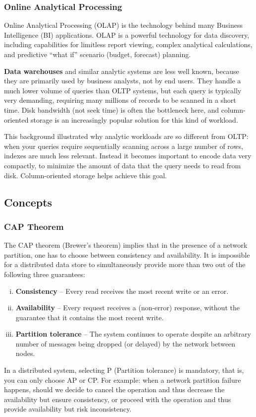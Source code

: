 \documentclass{article}
\begin{document}
    \subsubsection{Online Analytical Processing}
    Online Analytical Processing (OLAP) is the technology behind many Business Intelligence (BI) applications. OLAP is a powerful technology for data discovery, including capabilities for limitless report viewing, complex analytical calculations, and predictive “what if” scenario (budget, forecast) planning.

    \textbf{Data warehouses} and similar analytic systems are less well known, because they are primarily used by business analysts, not by end users. They handle a much lower volume of queries than OLTP systems, but each query is typically very demanding, requiring many millions of records to be scanned in a short time. Disk bandwidth (not seek time) is often the bottleneck here, and column-oriented storage is an increasingly popular solution for this kind of workload.
    
    This background illustrated why analytic workloads are so different from OLTP: when your queries require sequentially scanning across a large number of rows, indexes are much less relevant. Instead it becomes important to encode data very compactly, to minimize the amount of data that the query needs to read from disk. Column-oriented storage helps achieve this goal.
    
    \subsection{Concepts}
    \subsubsection{CAP Theorem}
    The CAP theorem (Brewer's theorem) implies that in the presence of a network partition, one has to choose between consistency and availability. It is impossible for a distributed data store to simultaneously provide more than two out of the following three guarantees:
    \begin{enumerate}[i.]
        \item \textbf{Consistency} -- Every read receives the most recent write or an error.
        \item \textbf{Availability} -- Every request receives a (non-error) response, without the guarantee that it contains the most recent write.
        \item \textbf{Partition tolerance} -- The system continues to operate despite an arbitrary number of messages being dropped (or delayed) by the network between nodes.
    \end{enumerate}
    In a distributed system, selecting P (Partition tolerance) is mandatory, that is, you can only choose AP or CP. For example: when a network partition failure happens, should we decide to cancel the operation and thus decrease the availability but ensure consistency, or proceed with the operation and thus provide availability but risk inconsistency.
    
\end{document}
